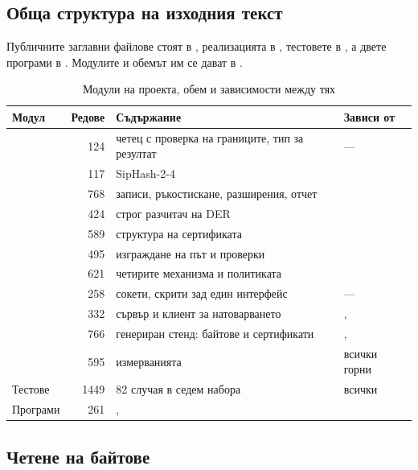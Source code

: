 \subsection{Обща структура на изходния текст}
\label{subsec:structure}

Публичните заглавни файлове стоят в , реализацията в ,
тестовете в , а двете програми в . Модулите и обемът им се дават в
.

\begin{table}[H]
\caption{Модули на проекта, обем и зависимости между тях}
\label{tab:modules}
\centering
\fontsize{11}{13}\selectfont
\begin{tabular}{L{3.0cm} r L{4.2cm} L{4.4cm}}
\toprule
Модул & Редове & Съдържание & Зависи от \\
\midrule
{} & 124 & четец с проверка на границите, тип за резултат & --- \\
 & 117 & SipHash-2-4 &  \\
 & 768 & записи, ръкостискане, разширения, отчет &  \\
 & 424 & строг разчитач на DER &  \\
 & 589 & структура на сертификата &  \\
 & 495 & изграждане на път и проверки &  \\
 & 621 & четирите механизма и политиката &  \\
 & 258 & сокети, скрити зад един интерфейс & --- \\
 & 332 & сървър и клиент за натоварването & ,  \\
 & 766 & генериран стенд: байтове и сертификати & ,  \\
 & 595 & измерванията & всички горни \\
\midrule
Тестове & 1449 & 82 случая в седем набора & всички \\
Програми & 261 & ,  &  \\
\bottomrule
\end{tabular}
\end{table}

\subsection{Четене на байтове}
\label{subsec:impl_bytes}

